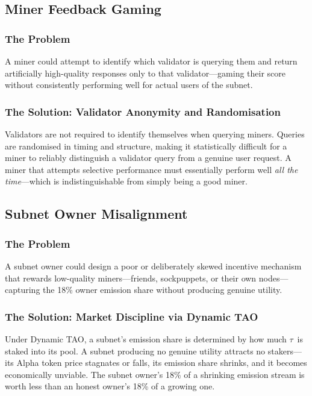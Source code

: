 \documentclass[12pt, a4paper, oneside]{report}
\newcommand{\TAO}{$\tau$}            %
\theoremstyle{definition}
\begin{document}
\subsection{Miner Feedback Gaming}

\subsubsection*{The Problem}

A miner could attempt to identify which validator is querying them and return 
artificially high-quality responses only to that validator—gaming their score 
without consistently performing well for actual users of the subnet.

\subsubsection*{The Solution: Validator Anonymity and Randomisation}

Validators are not required to identify themselves when querying miners. 
Queries are randomised in timing and structure, making it statistically 
difficult for a miner to reliably distinguish a validator query from a 
genuine user request. A miner that attempts selective performance must 
essentially perform well \emph{all the time}—which is indistinguishable 
from simply being a good miner.

\subsection{Subnet Owner Misalignment}

\subsubsection*{The Problem}

A subnet owner could design a poor or deliberately skewed incentive mechanism 
that rewards low-quality miners—friends, sockpuppets, or their own nodes—
capturing the 18\% owner emission share without producing genuine utility.

\subsubsection*{The Solution: Market Discipline via Dynamic TAO}

Under Dynamic TAO, a subnet's emission share is determined by how much \TAO\ 
is staked into its pool. A subnet producing no genuine utility attracts no 
stakers—its Alpha token price stagnates or falls, its emission share shrinks, 
and it becomes economically unviable. The subnet owner's 18\% of a shrinking 
emission stream is worth less than an honest owner's 18\% of a growing one.\\[0.4cm]
\end{document}
